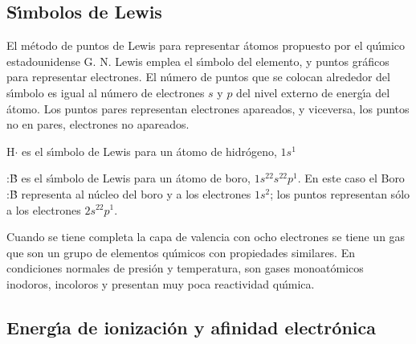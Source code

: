 \subsection{S\'{\i}mbolos de Lewis}
El m\'etodo de puntos de Lewis para representar \'atomos propuesto por el qu\'{\i}\-mi\-co estadounidense G. N. Lewis emplea el  s\'{\i}mbolo del elemento, y puntos gr\'a\-fi\-cos para representar electrones. El n\'umero de puntos que se colocan alrededor del s\'{\i}mbolo es igual al n\'umero de
electrones $s$ y $p$ del nivel externo de energ\'{\i}a del \'atomo. Los puntos pares representan electrones apareados, y viceversa, los puntos no en pares, electrones no apareados.
\newpage
\begin{example}
H$\cdot$ es el s\'{\i}mbolo de Lewis para un \'atomo de hidr\'ogeno, $1s^1$

 :\.B es el s\'{\i}mbolo de Lewis para un \'atomo de boro,
$1s^22s^22p^1$. En este caso el Boro  :\.B representa al n\'ucleo del
boro y a los electrones $1s^2$; los puntos representan s\'olo  a los
electrones $2s^22p^1$.
\end{example}

Cuando se tiene completa la capa de valencia con  ocho electrones se tiene un gas   que son un grupo de elementos qu\'{\i}micos con propiedades  similares. En condiciones normales de presi\'on y temperatura, son gases monoat\'omicos inodoros, incoloros y presentan muy poca reactividad qu\'{\i}mica.

\subsection{Energ\'{\i}a de ionizaci\'on y afinidad electr\'onica}

